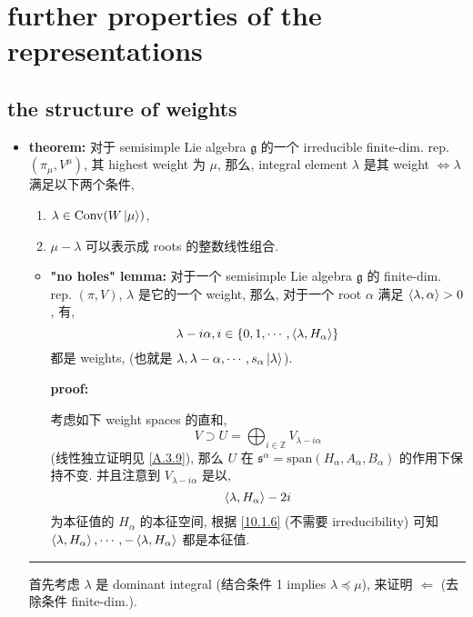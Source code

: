 \chapter{further properties of the representations}
\section{the structure of weights}
\begin{itemize}
	\item \textbf{theorem:} 对于 semisimple Lie algebra $\mathfrak{g}$ 的一个 irreducible finite-dim. rep. $(\pi_\mu, V^\mu)$, 其 highest weight 为 $\mu$, 那么, integral element $\lambda$ 是其 weight $\iff \lambda$ 满足以下两个条件,
	\begin{enumerate}
		\item $\lambda \in \mathrm{Conv}(W \ket{\mu})$,
		
		\item $\mu - \lambda$ 可以表示成 roots 的整数线性组合.
	\end{enumerate}
	
	\begin{tcolorbox}[title=proof:]
		\begin{itemize}
			\item \textbf{"no holes" lemma:} 对于一个 semisimple Lie algebra $\mathfrak{g}$ 的 finite-dim. rep. $(\pi, V)$, $\lambda$ 是它的一个 weight, 那么, 对于一个 root $\alpha$ 满足 $\braket{\lambda, \alpha} > 0$, 有,
			\begin{equation}
				\lambda - i \alpha, i \in \{0, 1, \cdots, \braket{\lambda, H_\alpha}\}
			\end{equation}
			都是 weights, (也就是 $\lambda, \lambda - \alpha, \cdots, s_\alpha \ket{\lambda}$).
			
			\noindent\hdashrule[0.5ex]{\linewidth}{0.5pt}{1mm} %
			
			\textbf{proof:}
			
			考虑如下 weight spaces 的直和,
			\begin{equation}
				V \supset U = \bigoplus_{i \in \mathbb{Z}} V_{\lambda - i \alpha}
			\end{equation}
			(线性独立证明见 \eqref{A.3.9}), 那么 $U$ 在 $\mathfrak{s}^\alpha = \mathrm{span}(H_\alpha, A_\alpha, B_\alpha)$ 的作用下保持不变. 并且注意到 $V_{\lambda - i \alpha}$ 是以,
			\begin{equation}
				\braket{\lambda, H_\alpha} - 2 i
			\end{equation}
			为本征值的 $H_\alpha$ 的本征空间, 根据 \eqref{10.1.6} (不需要 irreducibility) 可知 $\braket{\lambda, H_\alpha}, \cdots, - \braket{\lambda, H_\alpha}$ 都是本征值.
		\end{itemize}
		
		\noindent\rule[0.5ex]{\linewidth}{0.5pt} %
		
		首先考虑 $\lambda$ 是 dominant integral (结合条件 1 implies $\lambda \preceq \mu$), 来证明 $\Longleftarrow$ (去除条件 finite-dim.).
	\end{tcolorbox}
\end{itemize}


